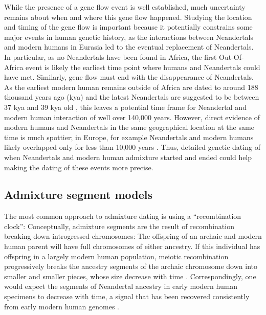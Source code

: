 \documentclass[]{article}
\begin{document}
While the presence of a gene flow event is well established, much uncertainty remains about when and where this gene flow happened. Studying the location and timing of the gene flow is important because it potentially constrains some major events in human genetic history, as the interactions between Neandertals and modern humans in Eurasia led to the eventual replacement of Neandertals. In particular, as no Neandertals have been found in Africa, the first Out-Of-Africa event is likely the earliest time point where humans and Neandertals could have met. Similarly, gene flow must end with the disappearance of Neandertals. As the earliest modern human remains outside of Africa are dated to around 188 thousand years ago (kya)  \citep{stringer_when_2018,hershkovitz_earliest_2018} and the latest Neandertals are suggested to be between 37 kya and 39 kya old \citep{zilhao_precise_2017, higham_timing_2014}, this leaves a potential time frame for Neandertal and modern human interaction of well over 140,000 years. However, direct evidence of modern humans and Neandertals in the same geographical location at the same time is much spottier; in Europe, for example Neandertals and modern humans likely overlapped only for less than 10,000 years \citep{bard_extended_2020}. Thus, detailed genetic dating of when Neandertals and modern human admixture started and ended could help making the dating of these events more precise.

\subsection{Admixture segment models}\label{Admixture models}

The most common approach to admixture dating is using a ``recombination clock'': Conceptually, admixture segments are the result of recombination breaking down introgressed chromosomes: The offspring of an archaic and modern human parent will have full chromosomes of either ancestry. If this individual has offspring in a largely modern human population, meiotic recombination progressively breaks the ancestry segments of the archaic chromosome  down into smaller and smaller pieces, whose size decrease with time \citep{falush_inference_2003, liang_lengths_2014, gravel_population_2012}. Correspondingly, one would expect the segments of Neandertal ancestry in early modern human specimens to decrease with time, a signal that has been recovered consistently from early modern human genomes \citep{fu_genome_2014,fu_early_2015, moorjani_genetic_2016, sikora_ancient_2017, sikora_population_2019, hajdinjak_early_2021}. 
\end{document}
